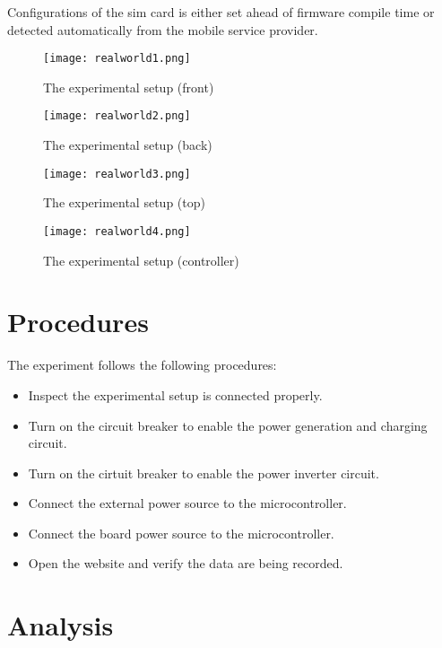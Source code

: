 \documentclass[../thesis.tex]{subfiles}
\begin{document}
Configurations of the sim card is either set ahead of firmware compile time or detected automatically from the mobile service provider.

\begin{figure}[!ht]
	\centering
	\texttt{[image: realworld1.png]}
	\caption{The experimental setup (front)}
	\label{fig:realworld1}
\end{figure}

\begin{figure}[!ht]
	\centering
	\texttt{[image: realworld2.png]}
	\caption{The experimental setup (back)}
	\label{fig:realworld2}
\end{figure}

\begin{figure}[!ht]
	\centering
	\texttt{[image: realworld3.png]}
	\caption{The experimental setup (top)}
	\label{fig:realworld3}
\end{figure}

\begin{figure}[!ht]
	\centering
	\texttt{[image: realworld4.png]}
	\caption{The experimental setup (controller)}
	\label{fig:realworld4}
\end{figure}

\section{Procedures} %

The experiment follows the following procedures:

\begin{itemize}
	\item Inspect the experimental setup is connected properly.
	\item Turn on the circuit breaker to enable the power generation and charging circuit. 
	\item Turn on the cirtuit breaker to enable the power inverter circuit. 
	\item Connect the external power source to the microcontroller.
	\item Connect the board power source to the microcontroller.
	\item Open the website and verify the data are being recorded.
\end{itemize}

\section{Analysis}
\end{document}
